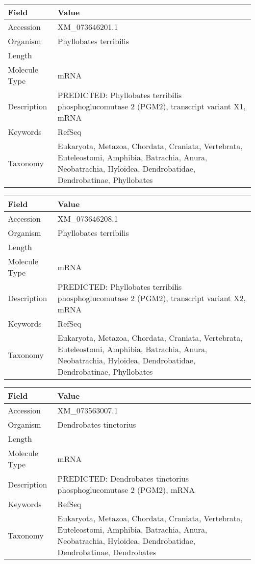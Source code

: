 \documentclass[10pt]{article}
\begin{document}
\vspace{1em}
{\footnotesize
\begin{longtable}{>{\raggedright\arraybackslash}p{4.5cm} >{\raggedright\arraybackslash}p{11.5cm}}
\textbf{Field} & \textbf{Value} \\
\hline
Accession & XM\_073646201.1 \\
Organism & Phyllobates terribilis \\
Length & 2266 \\
Molecule Type & mRNA \\
Description & PREDICTED: Phyllobates terribilis phosphoglucomutase 2 (PGM2), transcript variant X1, mRNA \\
Keywords & RefSeq \\
Taxonomy & Eukaryota, Metazoa, Chordata, Craniata, Vertebrata, Euteleostomi, Amphibia, Batrachia, Anura, Neobatrachia, Hyloidea, Dendrobatidae, Dendrobatinae, Phyllobates \\
\end{longtable}
}

\vspace{1em}
{\footnotesize
\begin{longtable}{>{\raggedright\arraybackslash}p{4.5cm} >{\raggedright\arraybackslash}p{11.5cm}}
\textbf{Field} & \textbf{Value} \\
\hline
Accession & XM\_073646208.1 \\
Organism & Phyllobates terribilis \\
Length & 2182 \\
Molecule Type & mRNA \\
Description & PREDICTED: Phyllobates terribilis phosphoglucomutase 2 (PGM2), transcript variant X2, mRNA \\
Keywords & RefSeq \\
Taxonomy & Eukaryota, Metazoa, Chordata, Craniata, Vertebrata, Euteleostomi, Amphibia, Batrachia, Anura, Neobatrachia, Hyloidea, Dendrobatidae, Dendrobatinae, Phyllobates \\
\end{longtable}
}

\vspace{1em}
{\footnotesize
\begin{longtable}{>{\raggedright\arraybackslash}p{4.5cm} >{\raggedright\arraybackslash}p{11.5cm}}
\textbf{Field} & \textbf{Value} \\
\hline
Accession & XM\_073563007.1 \\
Organism & Dendrobates tinctorius \\
Length & 2226 \\
Molecule Type & mRNA \\
Description & PREDICTED: Dendrobates tinctorius phosphoglucomutase 2 (PGM2), mRNA \\
Keywords & RefSeq \\
Taxonomy & Eukaryota, Metazoa, Chordata, Craniata, Vertebrata, Euteleostomi, Amphibia, Batrachia, Anura, Neobatrachia, Hyloidea, Dendrobatidae, Dendrobatinae, Dendrobates \\
\end{longtable}
}
\end{document}
